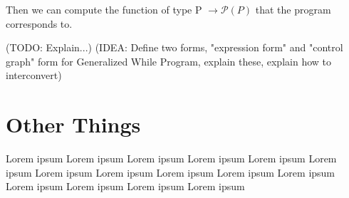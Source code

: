\documentclass[11pt]{article}
\begin{document}
Then we can compute the function of type P $\rightarrow \mathcal{P}(P)$ that the program corresponds to.

(TODO: Explain...)
(IDEA: Define two forms, "expression form" and "control graph" form for Generalized While Program, explain these, explain how to interconvert)

\section{Other Things}
Lorem ipsum Lorem ipsum Lorem ipsum Lorem ipsum Lorem ipsum Lorem ipsum Lorem ipsum Lorem ipsum Lorem ipsum Lorem ipsum Lorem ipsum Lorem ipsum Lorem ipsum Lorem ipsum Lorem ipsum 
\end{document}
